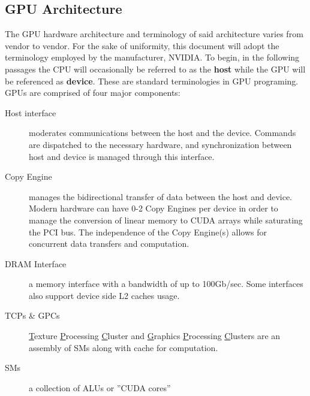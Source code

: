 \subsection{GPU Architecture}\label{ssec:gpu_architecture}
The GPU hardware architecture and terminology of said architecture varies from
vendor to vendor.  For the sake of uniformity, this document will adopt the
terminology employed by the manufacturer, NVIDIA.  To begin, in the following passages the CPU
will occasionally be referred to as the \textbf{host} while the GPU will be referenced as \textbf{device}.
These are standard terminologies in GPU programing. GPUs are comprised of four major components:
\begin{description}
  \item[Host interface] moderates communications between the host and the device.
  Commands are dispatched to the necessary hardware, and synchronization between
  host and device is managed through this interface.
  \item[Copy Engine] manages the bidirectional transfer of data between the host
  and device.  Modern hardware can have 0-2 Copy Engines per device in order to
  manage the conversion of linear memory to CUDA arrays while saturating the PCI
  bus.  The independence of the Copy Engine(s) allows for concurrent data transfers
  and computation.
  \item[DRAM Interface] a memory interface with a bandwidth of up to 100Gb/sec\cite{Wilt}.
  Some interfaces also support device side L2 caches usage.
  \item[TCPs \& GPCs] \underline{T}exture \underline{P}rocessing \underline{C}luster
  and \underline{G}raphics \underline{P}rocessing \underline{C}lusters are an assembly
  of \Glspl{SM} along with cache for computation.
  \item[\Glspl{SM}] a collection of \Glspl{ALU} or ''CUDA cores''
\end{description}\cite{Wilt}

